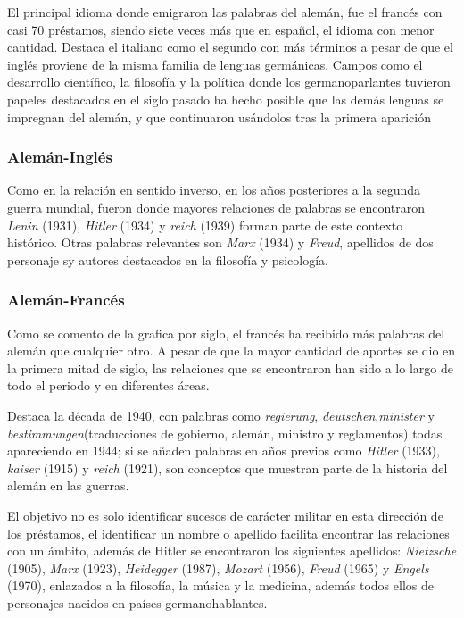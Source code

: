 El principal idioma donde emigraron las palabras del alemán, fue el francés con casi 70 préstamos, siendo siete veces más que en español, el idioma con menor cantidad. Destaca el italiano como el segundo con más términos a pesar de que el inglés proviene de la misma familia de lenguas germánicas.  Campos como el desarrollo científico, la filosofía  y la política donde los germanoparlantes tuvieron papeles destacados en el siglo pasado ha hecho posible que las demás lenguas se impregnan del alemán, y que continuaron usándolos tras la primera aparición


\subsubsection*{Alemán-Inglés}

Como en la relación en sentido inverso, en los años posteriores a la segunda guerra mundial,  fueron donde mayores relaciones de palabras se encontraron  \textit{Lenin} (1931), \textit{Hitler} (1934) y \textit{reich} (1939) forman parte  de este contexto histórico.  Otras palabras relevantes son \textit{Marx} (1934) y \textit{Freud}, apellidos de dos personaje sy autores destacados en la filosofía y psicología. 


\subsubsection*{Alemán-Francés}

Como se comento de la grafica por siglo, el francés ha recibido más palabras del alemán que cualquier otro. A pesar de que la mayor cantidad de aportes se dio en la primera mitad de siglo, las relaciones que se encontraron han sido a lo largo de todo el periodo y en diferentes áreas. 

Destaca la década de 1940, con palabras como \textit{regierung},  \textit{deutschen},\textit{minister} y  \textit{bestimmungen}(traducciones de gobierno, alemán, ministro y reglamentos) todas apareciendo en 1944;  si se añaden palabras en años previos como \textit{Hitler} (1933), \textit{kaiser} (1915) y \textit{reich} (1921), son conceptos que muestran parte de la historia del alemán en las guerras. 

El objetivo no es solo identificar sucesos de carácter militar en esta dirección de los préstamos, el identificar un nombre o apellido facilita encontrar las relaciones con un ámbito,  además de Hitler se encontraron los siguientes apellidos:  \textit{Nietzsche} (1905),  \textit{Marx} (1923), \textit{Heidegger} (1987),  \textit{Mozart} (1956), \textit{Freud} (1965) y \textit{Engels} (1970), enlazados a la filosofía, la música y la medicina,  además todos ellos de personajes nacidos en países germanohablantes.


